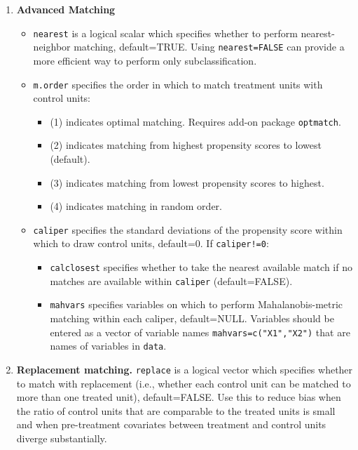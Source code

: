 \documentclass[oneside,letterpaper,titlepage]{article}
\begin{document}
\begin{enumerate}
\item \textbf{Advanced Matching}
  \begin{itemize}
  \item \texttt{nearest} is a logical scalar which specifies whether
    to perform nearest-neighbor matching, default=TRUE.  Using
    \texttt{nearest=FALSE} can provide a more efficient way to
    perform only subclassification. 
  \item \texttt{m.order}  specifies the order in which to match
    treatment units with control units:
    \begin{itemize}
    \item (1) indicates optimal matching.  Requires add-on package \texttt{optmatch}.
    \item (2) indicates matching from highest propensity scores to
      lowest (default).
    \item (3) indicates matching from lowest propensity scores to
      highest.
    \item (4) indicates matching in random order.
    \end{itemize}
  \item \texttt{caliper} specifies the standard deviations of 
    the propensity score within which to draw control units,
    default=0.  If \texttt{caliper!=0}: 
    \begin{itemize} 
    \item \texttt{calclosest} specifies whether to take the nearest
      available match if no matches are available within
      \texttt{caliper} (default=FALSE).
    \item \texttt{mahvars} specifies variables on which to perform
      Mahalanobis-metric matching within each caliper, default=NULL.
      Variables should be entered as a vector of variable names
      \texttt{mahvars=c("X1","X2")} that are names of variables in
      \texttt{data}.
    \end{itemize}
  \end{itemize}
  
\item \textbf{Replacement matching.} \texttt{replace} is a logical
  vector which specifies whether to match with replacement (i.e.,
  whether each control unit can be matched to more than one treated
  unit), default=FALSE.  Use this to reduce bias when the ratio of
  control units that are comparable to the treated units is small and
  when pre-treatment covariates between treatment and control units
  diverge substantially.
  

\end{enumerate}
\end{document}

